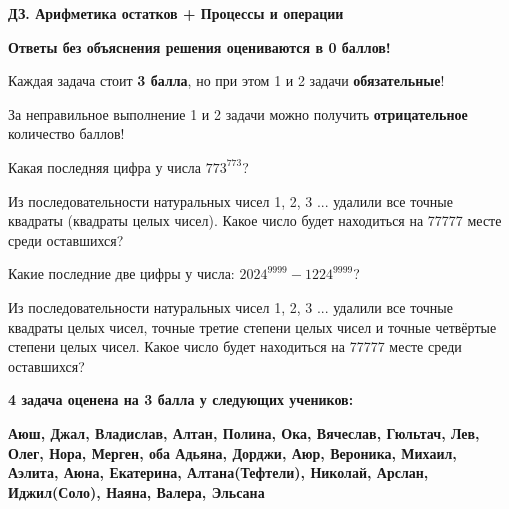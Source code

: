 \centerline{\bf \Huge ДЗ. Арифметика остатков + Процессы и операции}
\centerline{\bf \Huge }

\begin{flushright}
        \scriptsize{\textbf{Ответы без объяснения решения оцениваются в 0 баллов!}}
\end{flushright}

Каждая задача стоит \textbf{3 балла}, но при этом 1 и 2 задачи \textbf{обязательные}! 

За неправильное выполнение 1 и 2 задачи можно получить \textbf{отрицательное} количество баллов!

 Какая последняя цифра у числа $773^{773}$?

 Из последовательности натуральных чисел 1, 2, 3 ... удалили все точные квадраты (квадраты целых чисел). Какое число будет находиться на 77777 месте среди оставшихся?


 Какие последние две цифры у числа: $2024^{9999}-1224^{9999}$?


  Из последовательности натуральных чисел 1, 2, 3 ... удалили все точные квадраты целых чисел, точные третие степени целых чисел и точные четвёртые степени целых чисел. Какое число будет находиться на 77777 месте среди оставшихся?

\textbf{4 задача оценена на 3 балла у следующих учеников:}

\textbf{Аюш, Джал, Владислав, Алтан, Полина, Ока, Вячеслав, Гюльтач, Лев, Олег, Нора, Мерген, оба Адьяна, Дорджи, Аюр, Вероника, Михаил, Аэлита, Аюна, Екатерина, Алтана(Тефтели), Николай, Арслан, Иджил(Соло), Наяна, Валера, Эльсана}